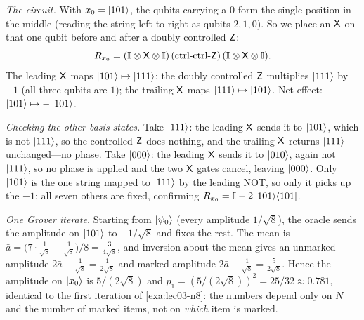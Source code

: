 \begin{solution}
\emph{The circuit.} With $x_0=\ket{101}$, the qubits carrying a $0$ form the single
position in the middle (reading the string left to right as qubits $2,1,0$). So we
place an $\mathsf{X}$ on that one qubit before and after a doubly controlled $\mathsf{Z}$:
\[
  R_{x_0}=(\mathbb{I}\otimes\mathsf{X}\otimes\mathbb{I})\,(\text{ctrl-ctrl-}\mathsf{Z})\,
          (\mathbb{I}\otimes\mathsf{X}\otimes\mathbb{I}).
\]
The leading $\mathsf{X}$ maps $\ket{101}\mapsto\ket{111}$; the doubly controlled
$\mathsf{Z}$ multiplies $\ket{111}$ by $-1$ (all three qubits are $1$); the trailing
$\mathsf{X}$ maps $\ket{111}\mapsto\ket{101}$. Net effect: $\ket{101}\mapsto-\ket{101}$.

\emph{Checking the other basis states.} Take $\ket{111}$: the leading $\mathsf{X}$
sends it to $\ket{101}$, which is not $\ket{111}$, so the controlled $\mathsf{Z}$ does
nothing, and the trailing $\mathsf{X}$ returns $\ket{111}$ unchanged---no phase. Take
$\ket{000}$: the leading $\mathsf{X}$ sends it to $\ket{010}$, again not $\ket{111}$,
so no phase is applied and the two $\mathsf{X}$ gates cancel, leaving $\ket{000}$. Only
$\ket{101}$ is the one string mapped to $\ket{111}$ by the leading NOT, so only it
picks up the $-1$; all seven others are fixed, confirming
$R_{x_0}=\mathbb{I}-2\ket{101}\!\bra{101}$.

\emph{One Grover iterate.} Starting from $\ket{\psi_0}$ (every amplitude
$1/\sqrt8$), the oracle sends the amplitude on $\ket{101}$ to $-1/\sqrt8$ and fixes
the rest. The mean is $\bar a=\bigl(7\cdot\tfrac1{\sqrt8}-\tfrac1{\sqrt8}\bigr)/8
=\tfrac{3}{4\sqrt8}$, and inversion about the mean gives an unmarked amplitude
$2\bar a-\tfrac1{\sqrt8}=\tfrac{1}{2\sqrt8}$ and marked amplitude
$2\bar a+\tfrac1{\sqrt8}=\tfrac{5}{2\sqrt8}$. Hence the amplitude on $\ket{x_0}$ is
$5/(2\sqrt8)$ and $p_1=(5/(2\sqrt8))^2=25/32\approx0.781$, identical to the first
iteration of \cref{exa:lec03-n8}: the numbers depend only on $N$ and the number of
marked items, not on \emph{which} item is marked.
\end{solution}

